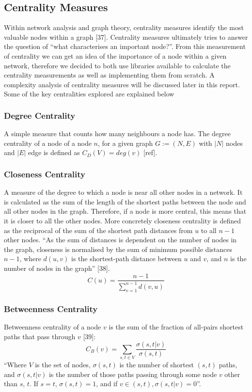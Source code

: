 \documentclass[9pt]{article}
\begin{document}
\subsection{Centrality Measures}
Within network analysis and graph theory, centrality measures identify the most valuable nodes within a graph [37]. Centrality measures ultimately tries to answer the question of  “what characterises an important node?”. From this measurement of centrality we can get an idea of the importance of a node within a given network, therefore we decided to both use libraries available to calculate the centrality measurements as well as implementing them from scratch. A complexity analysis of centrality measures will be discussed later in this report. Some of the key centralities explored are explained below

\subsubsection{Degree Centrality}
A simple measure that counts how many neighbours a node has. The degree centrality of a node of a node \(n\), for a given graph \(G:=(N,E)\) with \(|N|\) nodes and \(|E|\) edge is defined as \(C_D(V) = deg(v)\) [ref]. 

\subsubsection{Closeness Centrality}
A measure of the degree to which a node is near all other nodes in a network. It is calculated as the sum of the length of the shortest paths between the node and all other nodes in the graph. Therefore, if a node is more central, this means that it is closer to all the other nodes. More concretely closeness centrality is defined as the reciprocal of the sum of the shortest path distances from \(u\) to all \(n-1\) other nodes. “As the sum of distances is dependent on the number of nodes in the graph, closeness is normalised by the sum of minimum possible distances \(n-1\),  where \(d(u, v)\) is the shortest-path distance between \(u\) and \(v\), and \(n\) is the number of nodes in the graph” [38]. 
\begin{equation}
C(u)=\frac{n-1}{\sum_{v=1}^{n-1} d(v,u)}
\end{equation}

\subsubsection{Betweenness Centrality}
Betweenness centrality of a node \(v\) is the sum of the fraction of all-pairs shortest paths that pass through \(v\) [39]:
\begin{equation}
C_B(v)=\sum_{s,t\in{V}}\frac{\sigma(s, t|v)}{\sigma(s, t)}
\end{equation}
“Where \(V\) is the set of nodes, \(\sigma(s, t)\) is the number of shortest \((s, t)\) paths, and \(\sigma(s, t|v)\) is the number of those paths passing through some node \(v\) other than \(s\), \(t\). If \(s = t\), \(\sigma(s, t) = 1\), and if \(v \in (s, t), \sigma(s, t|v) = 0\)”.
\end{document}
